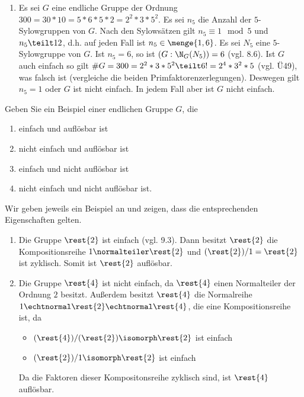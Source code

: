 \begin{uebungsblatt}
\begin{loesung}
\begin{enumerate}[label=(\arabic*)]
			\item Es sei $G$ eine endliche Gruppe der Ordnung $300 = 30*10 = 5*6*5*2 = 2^2*3*5^2$. Es sei $n_5$ die Anzahl der $5$-Sylowgruppen von $G$. Nach den Sylowsätzen gilt $n_5 \equiv 1 \mod 5$ und $n_5 \teilt 12$, d.h. auf jeden Fall ist $n_5 \in \menge{1,6}$. Es sei $N_5$ eine $5$-Sylowgruppe von $G$. Ist $n_5 = 6$, so ist $(G:\N_G(N_5)) = 6$ (vgl. 8.6). Ist $G$ auch einfach so gilt $\# G = 300 = 2^2*3*5^2 \teilt 6! =2^4*3^2*5$ (vgl. Ü49), was falsch ist (vergleiche die beiden Primfaktorenzerlegungen). Deswegen gilt $n_5 = 1$ oder $G$ ist nicht einfach. In jedem Fall aber ist $G$ nicht einfach.
		\end{enumerate}
	\end{loesung}
	
	\setcounter{taskcount}{80}
	\begin{uebung}[Präsenz]
		Geben Sie ein Beispiel einer endlichen Gruppe $G$, die
		\begin{enumerate}[label=(\roman*)]
			\item einfach und auflösbar ist
			\item nicht einfach und auflösbar ist
			\item einfach und nicht auflösbar ist
			\item nicht einfach und nicht auflösbar ist.
		\end{enumerate}
	\end{uebung}
	\begin{loesung}
		Wir geben jeweils ein Beispiel an und zeigen, dass die entsprechenden Eigenschaften gelten.
		\begin{enumerate}[label=(\roman*)]
			\item Die Gruppe $\rest{2}$ ist einfach (vgl. 9.3). Dann besitzt $\rest{2}$ die Kompositionsreihe $1 \normalteiler \rest{2}$ und $(\rest{2})/1 = \rest{2}$ ist zyklisch. Somit ist $\rest{2}$ auflösbar.
			\item Die Gruppe $\rest{4}$ ist nicht einfach, da $\rest{4}$ einen Normalteiler der Ordnung $2$ besitzt. Außerdem besitzt $\rest{4}$ die Normalreihe $1 \echtnormal \rest{2} \echtnormal \rest{4}$, die eine Kompositionsreihe ist, da
			\begin{itemize}[label=$-$]
				\item $(\rest{4})/(\rest{2}) \isomorph \rest{2}$ ist einfach
				\item $(\rest{2})/1 \isomorph \rest{2}$ ist einfach
			\end{itemize}
			Da die Faktoren dieser Kompositonsreihe zyklisch sind, ist $\rest{4}$ auflösbar.

\end{enumerate}
\end{loesung}
\end{uebungsblatt}

